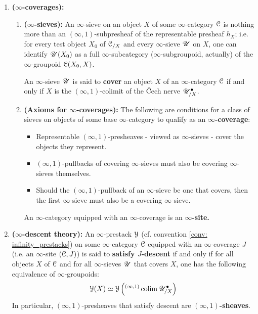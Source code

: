                 \begin{definition} \label{def: infinity_sites}
                    \noindent
                    \begin{enumerate}
                        \item \textbf{($\infty$-coverages):} 
                            \begin{enumerate}
                                \item \textbf{($\infty$-sieves):} An $\infty$-sieve on an object $X$ of some $\infty$-category $\mathcal{C}$ is nothing more than an $(\infty, 1)$-subpresheaf of the representable presheaf $h_X$; i.e. for every test object $X_0$ of $\mathcal{C}_{/X}$ and every $\infty$-sieve $\mathscr{U}$ on $X$, one can identify $\mathscr{U}(X_0)$ as a full $\infty$-subcategory ($\infty$-subgroupoid, actually) of the $\infty$-groupoid $\mathcal{C}(X_0, X)$.
                                
                                An $\infty$-sieve $\mathscr{U}$ is said to \textbf{cover} an object $X$ of an $\infty$-category $\mathcal{C}$ if and only if $X$ is the $(\infty, 1)$-colimit of the \v{C}ech nerve $\mathscr{U}^{\bullet}_{/X}$. 
                                \item \textbf{(Axioms for $\infty$-coverages):} The following are conditions for a class of sieves on objects of some base $\infty$-category to qualify as an \textbf{$\infty$-coverage}:
                                    \begin{itemize}
                                        \item Representable $(\infty, 1)$-presheaves - viewed as $\infty$-sieves - cover the objects they represent.
                                        \item $(\infty, 1)$-pullbacks of covering $\infty$-sieves must also be covering $\infty$-sieves themselves. 
                                        \item Should the $(\infty, 1)$-pullback of an $\infty$-sieve be one that covers, then the first $\infty$-sieve must also be a covering $\infty$-sieve.
                                    \end{itemize}
                                An $\infty$-category equipped with an $\infty$-coverage is an \textbf{$\infty$-site.}
                            \end{enumerate}
                        \item \textbf{($\infty$-descent theory):} An $\infty$-prestack $\mathcal{Y}$ (cf. convention \ref{conv: infinity_prestacks}) on some $\infty$-category $\mathcal{C}$ equipped with an $\infty$-coverage $J$ (i.e. an $\infty$-site $(\mathcal{C}, J)$) is said to \textbf{satisfy $J$-descent} if and only if for all objects $X$ of $\mathcal{C}$ and for all $\infty$-sieves $\mathscr{U}$ that covers $X$, one has the following equivalence of $\infty$-groupoids:
                            $$\mathcal{Y}(X) \simeq \mathcal{Y}\left({}^{(\infty, 1)}\operatorname{colim} \mathscr{U}^{\bullet}_{/X}\right)$$
                        In particular, $(\infty, 1)$-presheaves that satisfy descent are \textbf{$(\infty, 1)$-sheaves}.
                    \end{enumerate}
                \end{definition}
                
